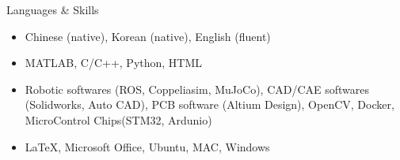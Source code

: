 \begin{rSection}{Languages \& Skills}
  \begin{itemize}
  \item Chinese (native), Korean (native), English (fluent)
  \item MATLAB, C/C++, Python, HTML
  \item Robotic softwares (ROS, Coppeliasim, MuJoCo), CAD/CAE softwares (Solidworks, Auto CAD), PCB software (Altium Design), OpenCV, Docker, MicroControl Chips(STM32, Ardunio)
  \item \LaTeX, Microsoft Office, Ubuntu, MAC, Windows
  \end{itemize}
\end{rSection}
